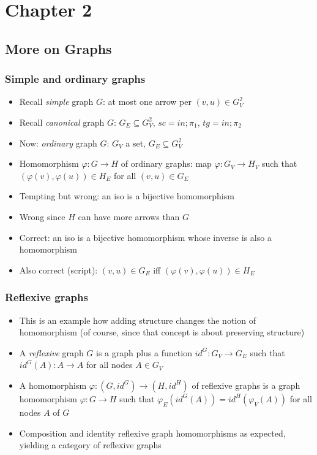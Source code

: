 \documentclass[handout]{beamer}
\begin{document}
\section{Chapter 2}
\subsection{More on Graphs}

\frame
  {   
    \frametitle{Simple and ordinary graphs}\label{Ch2:oGraph}

 \begin{itemize}[<+->]
\item Recall \emph{simple} graph $G$: at most one arrow per $(v,u)\in G_V^2$
\item Recall \emph{canonical} graph $G$:  $G_E\subseteq G_V^2$, $sc=in{;}\pi_1$, $tg=in{;}\pi_2$
\item Now: \emph{ordinary} graph $G$:  $G_V$ a set, $G_E\subseteq G_V^2$
\item Homomorphism $\varphi: G\to H$ of ordinary graphs: map $\varphi: G_V\to H_V$
such that $(\varphi(v),\varphi(u))\in H_E$ for all $(v,u)\in G_E$
\item Tempting but wrong: an iso is a bijective homomorphism
\item Wrong since $H$ can have more arrows than $G$
\item Correct: an iso is a bijective homomorphism whose inverse is also a homomorphism
\item Also correct (script): $(v,u)\in G_E$ iff $(\varphi(v),\varphi(u))\in H_E$
 \end{itemize}

 }

\frame
  {   
    \frametitle{Reflexive graphs}\label{Ch2:rGraph}

 \begin{itemize}[<+->]
\item This is an example how adding structure changes the notion of homomorphism
(of course, since that concept is about preserving structure)
\item A \emph{reflexive} graph $G$ is a graph plus a function $id^G : G_V \to G_E$
such that $id^G(A): A \to A$ for all nodes $A\in G_V$
\item A homomorphism $\varphi: (G,id^G)\to (H,id^H)$ of reflexive graphs
is a graph homomorphism $\varphi: G\to H$ such 
that $\varphi_E(id^G(A)) = id^H(\varphi_V(A))$ for all nodes $A$ of $G$
\item Composition and identity reflexive graph homomorphisms as expected,
yielding a category of reflexive graphs
 \end{itemize}

 }
\end{document}
